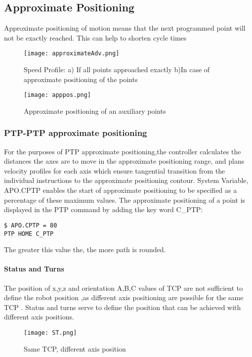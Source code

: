 \subsection{Approximate Positioning}
Approximate positioning of motion means that the next programmed point will not be exactly reached. This can help to shorten cycle times
 \begin{figure}[h]
	\caption{Speed Profile:
	\newline a) If all points approached exactly
	\newline b)In  case of approximate positioning of the points}
	\centering
	\texttt{[image: approximateAdv.png]}
\end{figure}
\begin{figure}[h]
	\caption{Approximate positioning of an auxiliary points}
	\centering
	\texttt{[image: apppos.png]}
\end{figure}

\subsubsection{PTP-PTP approximate positioning }
For the purposes of PTP approximate positioning,the controller calculates the distances the axes are to move in the approximate positioning range, and plans velocity profiles for each axis which ensure tangential transition from the individual instructions to the approximate positioning contour.
\vspace{0.3cm} 
\newline System Variable, \textdollar APO.CPTP enables the start of approximate positioning to be specified as a percentage of these maximum values.
The approximate positioning of a point is displayed in the PTP command by adding the key word C\_PTP: 
\begin{lstlisting}[language=terCmd]
$ APO.CPTP = 80
PTP HOME C_PTP
\end{lstlisting}
The greater this value the, the more path is rounded.


\paragraph{Status and Turns}
The position of x,y,z and orientation A,B,C values of TCP are not sufficient to define the robot position ,as different axis positioning  are possible for the same TCP .
Status and turns serve to define the position that can be achieved with different axis positions.
\begin{figure}[h]
	\centering
	\texttt{[image: ST.png]}
    	\caption{Same TCP, different axis position}
\end{figure}
